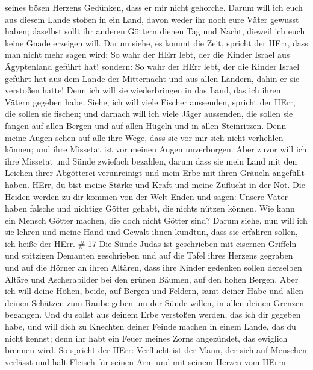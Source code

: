seines bösen Herzens Gedünken, dass er mir nicht gehorche. 
Darum will ich euch aus diesem Lande stoßen in ein Land, davon weder ihr
noch eure Väter gewusst haben; daselbst sollt ihr anderen Göttern dienen
Tag und Nacht, dieweil ich euch keine Gnade erzeigen will. 
Darum siehe, es kommt die Zeit, spricht der HErr, dass man nicht mehr
sagen wird: So wahr der HErr lebt, der die Kinder Israel aus Ägyptenland
geführt hat!  sondern: So wahr der HErr lebt, der die
Kinder Israel geführt hat aus dem Lande der Mitternacht und aus allen
Ländern, dahin er sie verstoßen hatte! Denn ich will sie wiederbringen
in das Land, das ich ihren Vätern gegeben habe.  Siehe, ich
will viele Fischer aussenden, spricht der HErr, die sollen sie fischen;
und darnach will ich viele Jäger aussenden, die sollen sie fangen auf
allen Bergen und auf allen Hügeln und in allen Steinritzen.
 Denn meine Augen sehen auf alle ihre Wege, dass sie vor
mir sich nicht verhehlen können; und ihre Missetat ist vor meinen Augen
unverborgen.  Aber zuvor will ich ihre Missetat und Sünde
zwiefach bezahlen, darum dass sie mein Land mit den Leichen ihrer
Abgötterei verunreinigt und mein Erbe mit ihren Gräueln angefüllt haben.
 HErr, du bist meine Stärke und Kraft und meine Zuflucht in
der Not. Die Heiden werden zu dir kommen von der Welt Enden und sagen:
Unsere Väter haben falsche und nichtige Götter gehabt, die nichts nützen
können.  Wie kann ein Mensch Götter machen, die doch nicht
Götter sind?  Darum siehe, nun will ich sie lehren und
meine Hand und Gewalt ihnen kundtun, dass sie erfahren sollen, ich heiße
der HErr. \# 17  Die Sünde Judas ist geschrieben mit
eisernen Griffeln und spitzigen Demanten geschrieben und auf die Tafel
ihres Herzens gegraben und auf die Hörner an ihren Altären, 
dass ihre Kinder gedenken sollen derselben Altäre und Ascherabilder bei
den grünen Bäumen, auf den hohen Bergen.  Aber ich will
deine Höhen, beide, auf Bergen und Feldern, samt deiner Habe und allen
deinen Schätzen zum Raube geben um der Sünde willen, in allen deinen
Grenzen begangen.  Und du sollst aus deinem Erbe verstoßen
werden, das ich dir gegeben habe, und will dich zu Knechten deiner
Feinde machen in einem Lande, das du nicht kennst; denn ihr habt ein
Feuer meines Zorns angezündet, das ewiglich brennen wird. 
So spricht der HErr: Verflucht ist der Mann, der sich auf Menschen
verlässt und hält Fleisch für seinen Arm und mit seinem Herzen vom HErrn
